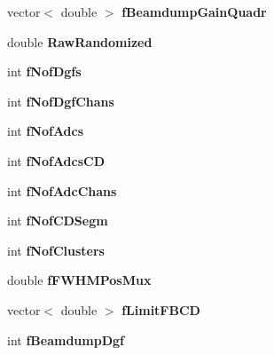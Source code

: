 \begin{DoxyCompactItemize}
\mbox{\label{class_calibration_a2e897ae3995fa09e6241a407bc57e3b8}} 
vector$<$ double $>$ {\bfseries f\+Beamdump\+Gain\+Quadr}
\item 
\mbox{\label{class_calibration_aefdfefa1d8aaf1dd0dc4119566f44b79}} 
double {\bfseries Raw\+Randomized}
\item 
\mbox{\label{class_calibration_a19434507a5b8bbc2cdde3f0b6b4889c7}} 
int {\bfseries f\+Nof\+Dgfs}
\item 
\mbox{\label{class_calibration_af9fcd69a29bc601ccc864105ed805c2e}} 
int {\bfseries f\+Nof\+Dgf\+Chans}
\item 
\mbox{\label{class_calibration_a492ca80c45be9ce1d85dfbf9f5852030}} 
int {\bfseries f\+Nof\+Adcs}
\item 
\mbox{\label{class_calibration_af87f261e5f5b78583250d67e8e08419a}} 
int {\bfseries f\+Nof\+Adcs\+CD}
\item 
\mbox{\label{class_calibration_abfda2f79950ce5ca7bf1aca363519fc5}} 
int {\bfseries f\+Nof\+Adc\+Chans}
\item 
\mbox{\label{class_calibration_ab03c449889b48d77b59ddf242a68ef59}} 
int {\bfseries f\+Nof\+C\+D\+Segm}
\item 
\mbox{\label{class_calibration_a9bbc91e22f4b6ec9b7c42fc7025cdbab}} 
int {\bfseries f\+Nof\+Clusters}
\item 
\mbox{\label{class_calibration_a1e62c67cc989b99f6fc991deabf1641b}} 
double {\bfseries f\+F\+W\+H\+M\+Pos\+Mux}
\item 
\mbox{\label{class_calibration_a659edb01b7d8ae2a574d8513aa6c8ca4}} 
vector$<$ double $>$ {\bfseries f\+Limit\+F\+B\+CD}
\item 
\mbox{\label{class_calibration_a1fc1809a608c626d462fe7d0859d52da}} 
int {\bfseries f\+Beamdump\+Dgf}
\end{DoxyCompactItemize}


